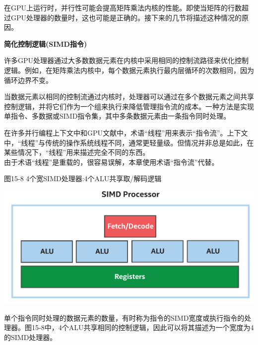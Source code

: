 在GPU上运行时，并行性可能会提高矩阵乘法内核的性能。即使当矩阵的行数超过GPU处理器的数量时，这也可能是正确的。接下来的几节将描述这种情况的原因。\par

\hspace*{\fill} \par %
\textbf{简化控制逻辑(SIMD指令)}

许多GPU处理器通过大多数数据元素在内核中采用相同的控制流路径来优化控制逻辑。例如，在矩阵乘法内核中，每个数据元素执行最内层循环的次数相同，因为循环边界不变。\par

当数据元素以相同的控制流通过内核时，处理器可以通过在多个数据元素之间共享控制逻辑，并将它们作为一个组来执行来降低管理指令流的成本。一种方法是实现单指令、多数据或SIMD指令集，其中多条数据元素由一条指令同时处理。\par

\begin{tcolorbox}[colback=blue!5!white,colframe=blue!75!black, title=线程与指令流]
在许多并行编程上下文中和GPU文献中，术语“线程”用来表示“指令流”。上下文中，“线程”与传统的操作系统线程不同，通常更轻量级。但情况并非总是如此，在某些情况下，“线程”用来描述完全不同的东西。\\

由于术语“线程”是重载的，很容易误解，本章使用术语“指令流”代替。
\end{tcolorbox}

\hspace*{\fill} \par %
图15-8 4个宽SIMD处理器:4个ALU共享取/解码逻辑
\begin{center}
	\includegraphics[width=1.0\textwidth]{content/chapter-15/images/6}
\end{center}

单个指令同时处理的数据元素的数量，有时称为指令的SIMD宽度或执行指令的处理器。图15-8中，4个ALU共享相同的控制逻辑，因此可以将其描述为一个宽度为4的SIMD处理器。\par

